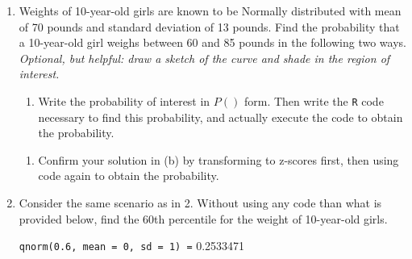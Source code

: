 \documentclass[
  letterpaper,
  DIV=11,
  numbers=noendperiod]{scrartcl}
\providecommand{\tightlist}{%
  \setlength{\itemsep}{0pt}\setlength{\parskip}{0pt}}
\begin{document}
\begin{enumerate}
\def\labelenumi{\arabic{enumi}.}
\setcounter{enumi}{1}
\item
  Weights of 10-year-old girls are known to be Normally distributed with
  mean of 70 pounds and standard deviation of 13 pounds. Find the
  probability that a 10-year-old girl weighs between 60 and 85 pounds in
  the following two ways. \emph{Optional, but helpful: draw a sketch of
  the curve and shade in the region of interest.}

  \begin{enumerate}
  \def\labelenumii{\alph{enumii}.}
  \tightlist
  \item
    Write the probability of interest in \(P()\) form. Then write the
    \texttt{R} code necessary to find this probability, and actually
    execute the code to obtain the probability.
  \end{enumerate}

  \vspace{3cm}

  \begin{enumerate}
  \def\labelenumii{\alph{enumii}.}
  \setcounter{enumii}{1}
  \tightlist
  \item
    Confirm your solution in (b) by transforming to z-scores first, then
    using code again to obtain the probability.
  \end{enumerate}

  \vspace{4cm}
\item
  Consider the same scenario as in 2. Without using any code than what
  is provided below, find the 60th percentile for the weight of
  10-year-old girls.

  \texttt{qnorm(0.6,\ mean\ =\ 0,\ sd\ =\ 1)\ =} 0.2533471
\end{enumerate}
\end{document}
